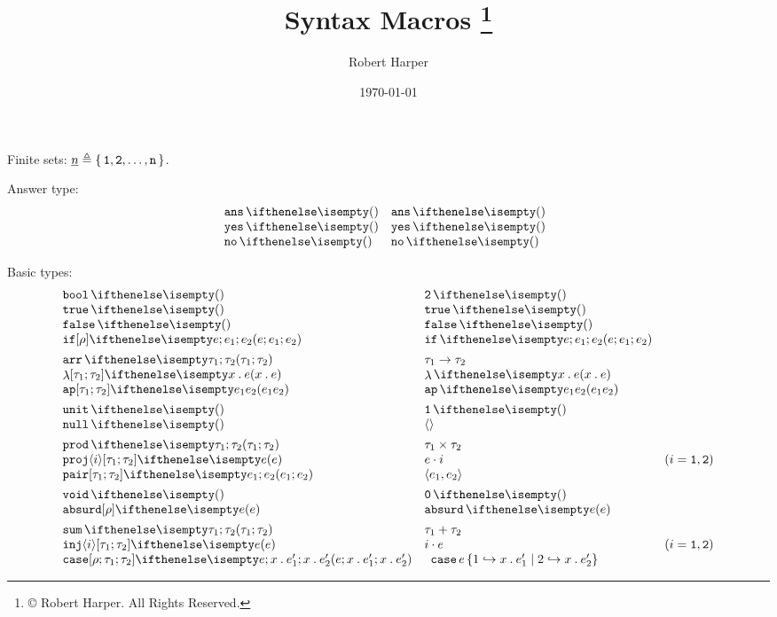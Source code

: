 \documentclass[11pt,twoside]{article}
\title{\PFPL{} Syntax Macros%
\footnote{\copyright{} \the\year{} Robert Harper.  All Rights Reserved.}
  \ifthenelse{\boolean{draft}}{
    \\{\Large\textbf{\textsc{DRAFT}}}
  }
  {}
}
\author{Robert Harper}
\date{\today}
\begin{document}
\maketitle{}

Finite sets: $\underline{n}\mathrel{\triangleq}{}\{\,\texttt{1},\texttt{2},\dots,\texttt{n}\,\}$.

Answer type:
\begin{displaymath}
  \begin{array}{l@{\quad}l@{\quad}l}
    \ansty & \ansty* \\
    \yesex & \yesex* \\
    \noex & \noex*  
  \end{array}
\end{displaymath}

Basic types:
\begin{displaymath}
  \begin{array}{l@{\quad}l@{\quad}l}
    \boolty & \boolty* \\
    \trueex & \trueex* \\
    \falseex & \falseex* \\
    \ifex{e}{e_1}{e_2} & \ifex*{e}{e_1}{e_2} \\[1ex]

    \arrty{\tau_1}{\tau_2} & \arrty*{\tau_1}{\tau_2} \\
    \lamex{x}{e} & \lamex*{x}{e} \\
    \appex{e_1}{e_2} & \appex*{e_1}{e_2} \\[1ex]

    \unitty{} & \unitty*{} \\
    \unitex{} & \unitex*{} \\[1ex]

    \prodty{\tau_1}{\tau_2} & \prodty*{\tau_1}{\tau_2} \\
    \projex<i>{e} & \projex*<i>{e} & (i=\kw{1},\kw{2}) \\
    \pairex{e_1}{e_2} & \pairex*{e_1}{e_2} \\[1ex]

    \voidty & \voidty* \\
    \absurdex[\rho]{e} & \absurdex*{e} \\[1ex]

    \sumty{\tau_1}{\tau_2} & \sumty*{\tau_1}{\tau_2} \\
    \injex<i>[\tau_1][\tau_2]{e} & \injex*<i>{e} & (i=\kw{1},\kw{2}) \\
    \caseex[\rho][\tau]{e}{x}{e'} & \multicolumn{2}{l}{\caseex*{e}{x}{e'}}   %

  \end{array}
\end{displaymath}
\end{document}
